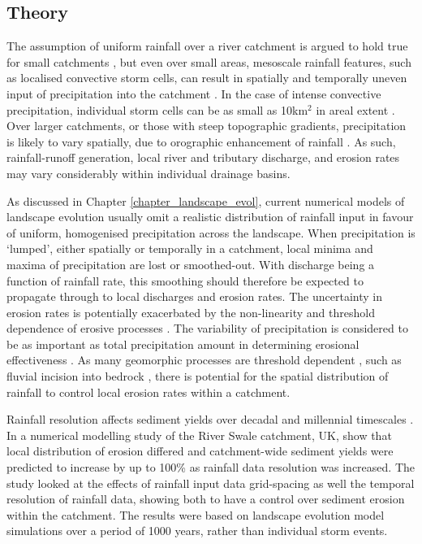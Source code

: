 \subsection{Theory}
The assumption of uniform rainfall over a river catchment is argued to hold true for small catchments \citep{Solyom2004,Tucker2010}, but even over small areas, mesoscale rainfall features, such as localised convective storm cells, can result in spatially and temporally uneven input of precipitation into the catchment \citep{Peleg2014}. In the case of intense convective precipitation, individual storm cells can be as small as 10km$^2$ in areal extent  \citep{weisman1986characteristics,vonhardenberg2003shape}. Over larger catchments, or those with steep topographic gradients, precipitation is likely to vary spatially, due to orographic enhancement of rainfall \citep{Roe2003,han2015measuring}. As such, rainfall-runoff generation, local river and tributary discharge, and erosion rates may vary considerably within individual drainage basins. 

As discussed in Chapter \ref{chapter_landscape_evol}, current numerical models of landscape evolution usually omit a realistic distribution of rainfall input in favour of uniform, homogenised precipitation across the landscape. When precipitation is `lumped', either spatially or temporally in a catchment, local minima and maxima of precipitation are lost or smoothed-out. With discharge being a function of rainfall rate, this smoothing should therefore be expected to propagate through to local discharges and erosion rates. The uncertainty in erosion rates is potentially exacerbated by the non-linearity and threshold dependence of erosive processes \citep{coulthard1998non,phillips2003sources}. The variability of precipitation is considered to be as important as total precipitation amount in determining erosional effectiveness \citep{Tucker2000,Tucker2010}. As many geomorphic processes are threshold dependent \citep{schumm1979geomorphic}, such as fluvial incision into bedrock \citep{sklar2001sediment,snyder2003importance}, there is potential for the spatial distribution of rainfall to control local erosion rates within a catchment. 

Rainfall resolution affects sediment yields over decadal and millennial timescales \citep{coulthard2016sensitivity}. In a numerical modelling study of the River Swale catchment, UK, \citet{coulthard2016sensitivity} show that local distribution of erosion differed and catchment-wide sediment yields were predicted to increase by up to 100\% as rainfall data resolution was increased. The study looked at the effects of rainfall input data grid-spacing as well the temporal resolution of rainfall data, showing both to have a control over sediment erosion within the catchment. The results were based on landscape evolution model simulations over a period of 1000 years, rather than individual storm events.

